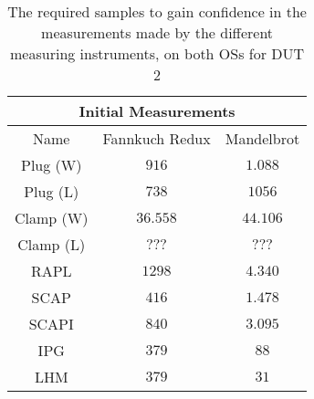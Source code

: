 \begin{table}[H]
    \centering
    \begin{tabular}{|| c | c | c ||}
    \hline
    \multicolumn{3}{||c||}{Initial Measurements} \\ [0.5ex] \hline\hline
    Name & Fannkuch Redux & Mandelbrot \\\hline
    Plug (W) & $916$ & $1.088$ \\
    Plug (L) & $738$ & $1056$ \\
    Clamp (W) & $36.558$ & $44.106$ \\
    Clamp (L) & $???$ & $???$ \\
    RAPL & $1298$ & $4.340$ \\
    SCAP & $416$ & $1.478$ \\
    SCAPI & $840$ & $3.095$ \\
    IPG & $379$ & $88$ \\
    LHM & $379$ & $31$ \\\hline
    \end{tabular}
    \caption{The required samples to gain confidence in the measurements made by the different measuring instruments, on both OSs for DUT 2}
    \label{tab:initial-measurements-exp-2-dut-2}
\end{table}